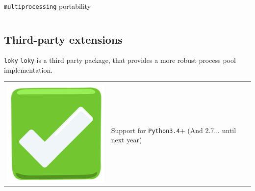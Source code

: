 \documentclass[13pt, usenames,dvipsnames]{beamer} %
\newcommand{\mycode}[2][\tiny] {\texttt{#2}}
\begin{document}
\begin{frame}[fragile]{\mycode[\small]{multiprocessing} portability}
{\begin{tabular}{m{0.5cm} m{10cm}}
        \end{tabular}}
    \end{frame}

    \subsection{Third-party extensions}

    \begin{frame}[t]{\mycode[\small]{loky}}
        \vspace{1em}
        \mycode[\small]{loky} is a third party package, that provides a more
        robust process pool implementation. 
        \begin{tabular}{m{0.5cm} m{10cm}}
            & \\
            \includegraphics[width=\linewidth] {media/green-tick-emoji.png} &
            Support for \mycode[\small]{Python3.4}+ (And 2.7... until next year)

\end{tabular}
\end{frame}
\end{document}
